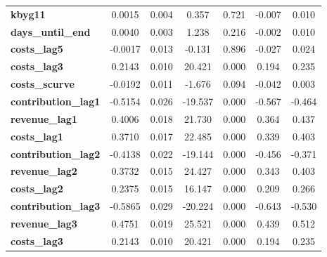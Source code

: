 \begin{center}
\begin{tabular}{lcccccc}
\textbf{kbyg11}                           &       0.0015  &        0.004     &     0.357  &         0.721        &       -0.007    &        0.010     \\
\textbf{days\_until\_end}                 &       0.0040  &        0.003     &     1.238  &         0.216        &       -0.002    &        0.010     \\
\textbf{costs\_lag5}                      &      -0.0017  &        0.013     &    -0.131  &         0.896        &       -0.027    &        0.024     \\
\textbf{costs\_lag3}                      &       0.2143  &        0.010     &    20.421  &         0.000        &        0.194    &        0.235     \\
\textbf{costs\_scurve}                    &      -0.0192  &        0.011     &    -1.676  &         0.094        &       -0.042    &        0.003     \\
\textbf{contribution\_lag1}               &      -0.5154  &        0.026     &   -19.537  &         0.000        &       -0.567    &       -0.464     \\
\textbf{revenue\_lag1}                    &       0.4006  &        0.018     &    21.730  &         0.000        &        0.364    &        0.437     \\
\textbf{costs\_lag1}                      &       0.3710  &        0.017     &    22.485  &         0.000        &        0.339    &        0.403     \\
\textbf{contribution\_lag2}               &      -0.4138  &        0.022     &   -19.144  &         0.000        &       -0.456    &       -0.371     \\
\textbf{revenue\_lag2}                    &       0.3732  &        0.015     &    24.427  &         0.000        &        0.343    &        0.403     \\
\textbf{costs\_lag2}                      &       0.2375  &        0.015     &    16.147  &         0.000        &        0.209    &        0.266     \\
\textbf{contribution\_lag3}               &      -0.5865  &        0.029     &   -20.224  &         0.000        &       -0.643    &       -0.530     \\
\textbf{revenue\_lag3}                    &       0.4751  &        0.019     &    25.521  &         0.000        &        0.439    &        0.512     \\
\textbf{costs\_lag3}                      &       0.2143  &        0.010     &    20.421  &         0.000        &        0.194    &        0.235     \\

\end{tabular}
\end{center}
